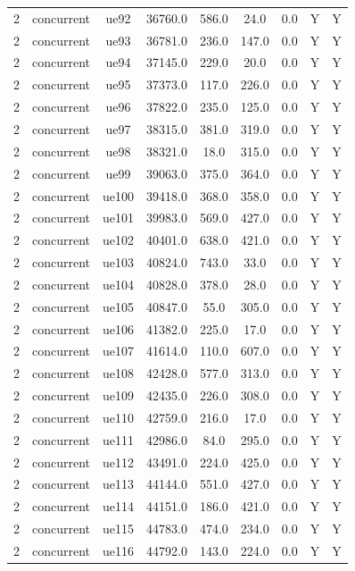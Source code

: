 \begin{table}[ht]
\begin{tabular}{|c|c|c|c|c|c|c|c|c|}
2 & concurrent & ue92 & 36760.0 & 586.0 & 24.0 & 0.0 & Y & Y \\
2 & concurrent & ue93 & 36781.0 & 236.0 & 147.0 & 0.0 & Y & Y \\
2 & concurrent & ue94 & 37145.0 & 229.0 & 20.0 & 0.0 & Y & Y \\
2 & concurrent & ue95 & 37373.0 & 117.0 & 226.0 & 0.0 & Y & Y \\
2 & concurrent & ue96 & 37822.0 & 235.0 & 125.0 & 0.0 & Y & Y \\
2 & concurrent & ue97 & 38315.0 & 381.0 & 319.0 & 0.0 & Y & Y \\
2 & concurrent & ue98 & 38321.0 & 18.0 & 315.0 & 0.0 & Y & Y \\
2 & concurrent & ue99 & 39063.0 & 375.0 & 364.0 & 0.0 & Y & Y \\
2 & concurrent & ue100 & 39418.0 & 368.0 & 358.0 & 0.0 & Y & Y \\
2 & concurrent & ue101 & 39983.0 & 569.0 & 427.0 & 0.0 & Y & Y \\
2 & concurrent & ue102 & 40401.0 & 638.0 & 421.0 & 0.0 & Y & Y \\
2 & concurrent & ue103 & 40824.0 & 743.0 & 33.0 & 0.0 & Y & Y \\
2 & concurrent & ue104 & 40828.0 & 378.0 & 28.0 & 0.0 & Y & Y \\
2 & concurrent & ue105 & 40847.0 & 55.0 & 305.0 & 0.0 & Y & Y \\
2 & concurrent & ue106 & 41382.0 & 225.0 & 17.0 & 0.0 & Y & Y \\
2 & concurrent & ue107 & 41614.0 & 110.0 & 607.0 & 0.0 & Y & Y \\
2 & concurrent & ue108 & 42428.0 & 577.0 & 313.0 & 0.0 & Y & Y \\
2 & concurrent & ue109 & 42435.0 & 226.0 & 308.0 & 0.0 & Y & Y \\
2 & concurrent & ue110 & 42759.0 & 216.0 & 17.0 & 0.0 & Y & Y \\
2 & concurrent & ue111 & 42986.0 & 84.0 & 295.0 & 0.0 & Y & Y \\
2 & concurrent & ue112 & 43491.0 & 224.0 & 425.0 & 0.0 & Y & Y \\
2 & concurrent & ue113 & 44144.0 & 551.0 & 427.0 & 0.0 & Y & Y \\
2 & concurrent & ue114 & 44151.0 & 186.0 & 421.0 & 0.0 & Y & Y \\
2 & concurrent & ue115 & 44783.0 & 474.0 & 234.0 & 0.0 & Y & Y \\
2 & concurrent & ue116 & 44792.0 & 143.0 & 224.0 & 0.0 & Y & Y \\

\end{tabular}
\end{table}

